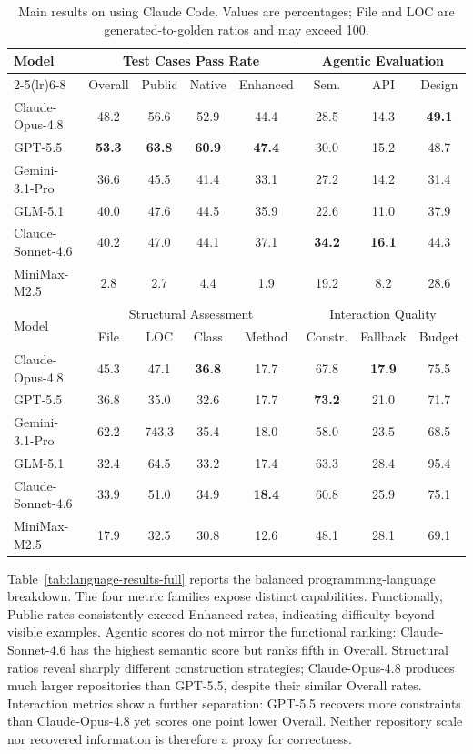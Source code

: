 \begin{table}[htbp]
\centering
\caption{Main results on \rcblite{} using Claude Code. Values are percentages; File and LOC are generated-to-golden ratios and may exceed 100.}
\label{tab:main-results-lite}
\small
\begin{tabular}{lccccccc}
\toprule
\multirow{2}{*}{Model} & \multicolumn{4}{c}{Test Cases Pass Rate} & \multicolumn{3}{c}{Agentic Evaluation} \\
\cmidrule(lr){2-5}\cmidrule(lr){6-8}
 & Overall & Public & Native & Enhanced & Sem. & API & Design \\
\midrule
Claude-Opus-4.8 & 48.2 & 56.6 & 52.9 & 44.4 & 28.5 & 14.3 & \textbf{49.1} \\
GPT-5.5 & \textbf{53.3} & \textbf{63.8} & \textbf{60.9} & \textbf{47.4} & 30.0 & 15.2 & 48.7 \\
Gemini-3.1-Pro & 36.6 & 45.5 & 41.4 & 33.1 & 27.2 & 14.2 & 31.4 \\
GLM-5.1 & 40.0 & 47.6 & 44.5 & 35.9 & 22.6 & 11.0 & 37.9 \\
Claude-Sonnet-4.6 & 40.2 & 47.0 & 44.1 & 37.1 & \textbf{34.2} & \textbf{16.1} & 44.3 \\
MiniMax-M2.5 & 2.8 & 2.7 & 4.4 & 1.9 & 19.2 & 8.2 & 28.6 \\
\midrule
\multirow{2}{*}{Model} & \multicolumn{4}{c}{Structural Assessment} & \multicolumn{3}{c}{Interaction Quality} \\
\cmidrule(lr){2-5}\cmidrule(lr){6-8}
 & File & LOC & Class & Method & Constr. & Fallback & Budget \\
\midrule
Claude-Opus-4.8 & 45.3 & 47.1 & \textbf{36.8} & 17.7 & 67.8 & \textbf{17.9} & 75.5 \\
GPT-5.5 & 36.8 & 35.0 & 32.6 & 17.7 & \textbf{73.2} & 21.0 & 71.7 \\
Gemini-3.1-Pro & 62.2 & 743.3 & 35.4 & 18.0 & 58.0 & 23.5 & 68.5 \\
GLM-5.1 & 32.4 & 64.5 & 33.2 & 17.4 & 63.3 & 28.4 & 95.4 \\
Claude-Sonnet-4.6 & 33.9 & 51.0 & 34.9 & \textbf{18.4} & 60.8 & 25.9 & 75.1 \\
MiniMax-M2.5 & 17.9 & 32.5 & 30.8 & 12.6 & 48.1 & 28.1 & 69.1 \\
\bottomrule
\end{tabular}
\end{table}

Table~\ref{tab:language-results-full} reports the balanced programming-language breakdown. The four metric families expose distinct capabilities. Functionally, Public rates consistently exceed Enhanced rates, indicating difficulty beyond visible examples. Agentic scores do not mirror the functional ranking: Claude-Sonnet-4.6 has the highest semantic score but ranks fifth in Overall. Structural ratios reveal sharply different construction strategies; Claude-Opus-4.8 produces much larger repositories than GPT-5.5, despite their similar Overall rates. Interaction metrics show a further separation: GPT-5.5 recovers more constraints than Claude-Opus-4.8 yet scores one point lower Overall. Neither repository scale nor recovered information is therefore a proxy for correctness.

